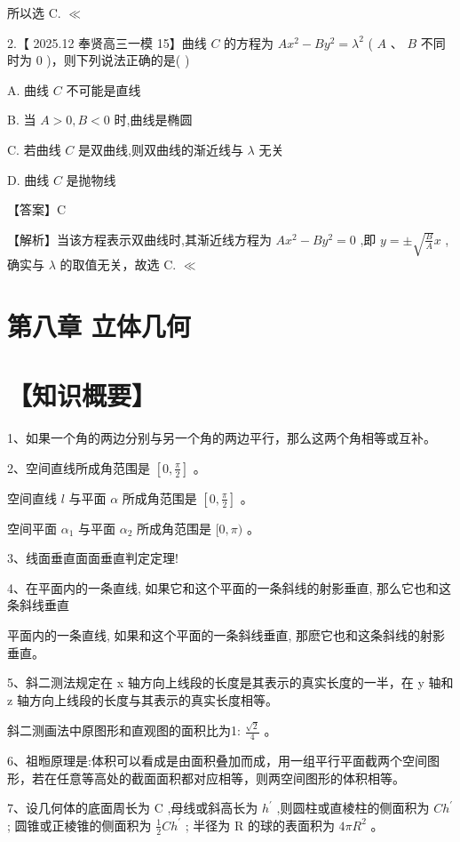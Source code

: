 \documentclass[10pt]{article}
\begin{document}
所以选 C. \(\ll\)

2.【 2025.12 奉贤高三一模 15】曲线 \(C\) 的方程为 \(A{x}^{2} - B{y}^{2} = {\lambda }^{2}\) ( \(A\) 、 \(B\) 不同时为 0 )，则下列说法正确的是( )

A. 曲线 \(C\) 不可能是直线

B. 当 \(A > 0,B < 0\) 时,曲线是椭圆

C. 若曲线 \(C\) 是双曲线,则双曲线的渐近线与 \(\lambda\) 无关

D. 曲线 \(C\) 是抛物线

【答案】C

【解析】当该方程表示双曲线时,其渐近线方程为 \(A{x}^{2} - B{y}^{2} = 0\) ,即 \(y =  \pm  \sqrt{\frac{B}{A}}x\) ,确实与 \(\lambda\) 的取值无关，故选 C. \(\ll\)

\section*{第八章 立体几何}

\section*{【知识概要】}

1、如果一个角的两边分别与另一个角的两边平行，那么这两个角相等或互补。

2、空间直线所成角范围是 \(\left\lbrack  {0,\frac{\pi }{2}}\right\rbrack\) 。

空间直线 \(l\) 与平面 \(\alpha\) 所成角范围是 \(\left\lbrack  {0,\frac{\pi }{2}}\right\rbrack\) 。

空间平面 \({\alpha }_{1}\) 与平面 \({\alpha }_{2}\) 所成角范围是 \(\lbrack 0,\pi )\) 。

3、线面垂直面面垂直判定定理!

4、在平面内的一条直线, 如果它和这个平面的一条斜线的射影垂直, 那么它也和这条斜线垂直

平面内的一条直线, 如果和这个平面的一条斜线垂直, 那麽它也和这条斜线的射影垂直。

5、斜二测法规定在 x 轴方向上线段的长度是其表示的真实长度的一半，在 y 轴和 z 轴方向上线段的长度与其表示的真实长度相等。

斜二测画法中原图形和直观图的面积比为1: \(\frac{\sqrt{2}}{4}\) 。

6、祖暅原理是:体积可以看成是由面积叠加而成，用一组平行平面截两个空间图形，若在任意等高处的截面面积都对应相等，则两空间图形的体积相等。

7、设几何体的底面周长为 \(\mathrm{C}\) ,母线或斜高长为 \({h}^{\prime }\) ,则圆柱或直棱柱的侧面积为 \(C{h}^{\prime }\) ; 圆锥或正棱锥的侧面积为 \(\frac{1}{2}C{h}^{\prime }\) ; 半径为 \(\mathrm{R}\) 的球的表面积为 \({4\pi }{R}^{2}\) 。
\end{document}
